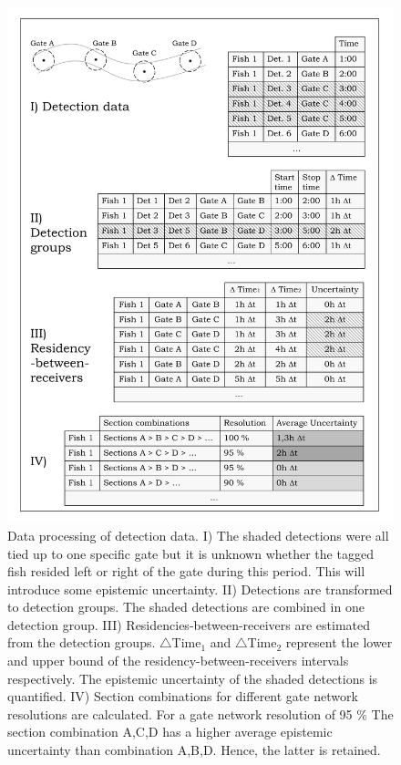 \begin{figure}[h!]
  \centering\includegraphics[scale=0.38]{Flow_chart.pdf}
  \caption{Data processing of detection data. I) The shaded detections were all tied up to one specific gate but it is unknown whether the tagged fish resided left or right of the gate during this period. This will introduce some epistemic uncertainty. II) Detections are transformed to detection groups. The shaded detections are combined in one detection group. III) Residencies-between-receivers are estimated from the detection groups. $\bigtriangleup$Time$_{1}$ and $\bigtriangleup$Time$_{2}$ represent the lower and upper bound of the residency-between-receivers intervals respectively. The epistemic uncertainty of the shaded detections is quantified. IV) Section combinations for different gate network resolutions are calculated. For a gate network resolution of 95 \% The section combination A,C,D has a higher average epistemic uncertainty than combination A,B,D. Hence, the latter is retained.}
  \label{fig:Flow_chart}
\end{figure}

